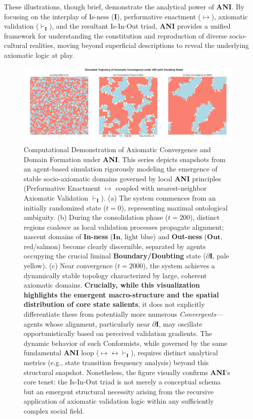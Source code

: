\documentclass{article}
\newcommand{\ANI}{\textbf{ANI}}             %
\newcommand{\Isness}{\mathbf{I}}            %
\newcommand{\Inness}{\mathbf{In}}           %
\newcommand{\Outness}{\mathbf{Out}}         %
\newcommand{\enactment}{\ensuremath{\mapsto}} %
\newcommand{\validates}[1]{\ensuremath{\vdash_{#1}}} %
\newcommand{\boundary}[1]{\ensuremath{\partial #1}} %
\begin{document}
These illustrations, though brief, demonstrate the analytical power of \ANI{}. By focusing on the interplay of Is-ness ($\Isness$), performative enactment ($\enactment$), axiomatic validation ($\validates{\Isness}$), and the resultant Is-In-Out triad, \ANI{} provides a unified framework for understanding the constitution and reproduction of diverse socio-cultural realities, moving beyond superficial descriptions to reveal the underlying axiomatic logic at play.

\begin{figure}[h!] %
    \centering
    \includegraphics[width=\textwidth]{figures/ani_figure2_abm_convergence_triple_3state_revised.png} 
    \caption{Computational Demonstration of Axiomatic Convergence and Domain Formation under \ANI{}. This series depicts snapshots from an agent-based simulation rigorously modeling the emergence of stable socio-axiomatic domains governed by local \ANI{} principles (Performative Enactment $\enactment$ coupled with nearest-neighbor Axiomatic Validation $\validates{\Isness}$). 
    (a) The system commences from an initially randomized state ($t=0$), representing maximal ontological ambiguity. 
    (b) During the consolidation phase ($t=200$), distinct regions coalesce as local validation processes propagate alignment; nascent domains of \textbf{In-ness} ($\Inness$, light blue) and \textbf{Out-ness} ($\Outness$, red/salmon) become clearly discernible, separated by agents occupying the crucial liminal \textbf{Boundary/Doubting} state ($\boundary{\Isness}$, pale yellow). 
    (c) Near convergence ($t=2000$), the system achieves a dynamically stable topology characterized by large, coherent axiomatic domains. 
    \textbf{Crucially, while this visualization highlights the emergent macro-structure and the spatial distribution of core state salients}, it does not explicitly differentiate these from potentially more numerous \textit{Convergents}—agents whose alignment, particularly near $\boundary{\Isness}$, may oscillate opportunistically based on perceived validation gradients. The dynamic behavior of such Conformists, while governed by the same fundamental \ANI{} loop ($\enactment \leftrightarrow \validates{\Isness}$), requires distinct analytical metrics (e.g., state transition frequency analysis) beyond this structural snapshot. Nonetheless, the figure visually confirms \ANI{}'s core tenet: the Is-In-Out triad is not merely a conceptual schema but an emergent structural necessity arising from the recursive application of axiomatic validation logic within any sufficiently complex social field.}

\end{figure}
\end{document}

